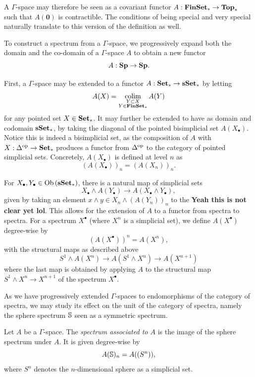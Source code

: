 A $\Gamma$-space may therefore be seen as a covariant functor $A : \textbf{FinSet}_* \to \textbf{Top}_*$ such that $A(\textbf{0})$ is contractible. The conditions of being special and very special naturally translate to this version of the definition as well.

To construct a spectrum from a $\Gamma$-space, we progressively expand both the domain and the co-domain of a $\Gamma$-space $A$ to obtain a new functor
\[A : \textbf{Sp} \to \textbf{Sp}.\]

First, a $\Gamma$-space may be extended to a functor $A : \textbf{Set}_* \to \textbf{sSet}_*$ by letting
\[ A(X) = \mathop{\mathrm{colim}}\limits_{\substack{Y \subset X\\ Y \in \textbf{FinSet}_*}} A(Y) \]
for any pointed set $X \in \textbf{Set}_*$. It may further be extended to have as domain and codomain $\textbf{sSet}_*$, by taking the diagonal of the pointed bisimplicial set $A(X_\bullet)$. Notice this is indeed a bisimplicial set, as the composition of $A$ with $X : \Delta^{\textnormal{op}} \to \textbf{Set}_*$ produces a functor from $\Delta^{\textnormal{op}}$ to the category of pointed simplicial sets. Concretely, $A(X_\bullet)$ is defined at level $n$ as
\[ (A(X_\bullet))_n = (A(X_n))_n. \]

For $X_\bullet,Y_\bullet \in \operatorname{Ob}{\lparen \textbf{sSet}_* \rparen}$, there is a natural map of simplicial sets $$X_\bullet \wedge A(Y_\bullet) \to A(X_\bullet \wedge Y_\bullet),$$ given by taking an element $x \wedge y \in X_n \wedge (A(Y_n))_n$ to the \textbf{Yeah this is not clear yet lol}. This allows for the extension of $A$ to a functor from spectra to spectra. For a spectrum $X^{\bullet}$ (where $X^n$ is a simplicial set), we define $A(X^{\bullet})$ degree-wise by
\[ (A(X^{\bullet}))^{n} = A(X^n),\]
with the structural maps as described above
\[ S^1 \wedge A(X^n) \to A(S^1 \wedge X^n) \to A(X^{n+1}) \]
where the last map is obtained by applying $A$ to the structural map $S^1 \wedge X^n \to X^{n+1}$ of the spectrum $X^{\bullet}$.

As we have progressively extended $\Gamma$-spaces to endomorphisms of the category of spectra, we may study its effect on the unit of the category of spectra, namely the sphere spectrum $\mathbb{S}$ seen as a symmetric spectrum.

\begin{definition}
    Let $A$ be a $\Gamma$-space. The \emph{spectrum associated to $A$} is the image of the sphere spectrum under $A$. It is given degree-wise by
    \[ A(\mathbb{S})_n = A((S^n)),\]
    where $S^n$ denotes the $n$-dimensional sphere as a simplicial set.
\end{definition}

